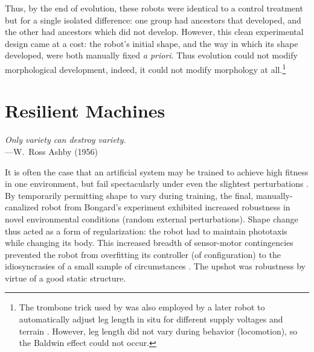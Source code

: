 Thus, by the end of evolution, these robots were identical to a control treatment but for a single isolated difference: one group had ancestors that developed, and the other had ancestors which did not develop.
However, this clean experimental design came at a cost: the robot's initial shape, and the way in which its shape developed, were both manually fixed \textit{a priori}. 
Thus evolution could not modify morphological development, indeed, it could not modify morphology at all.\footnote{%
The trombone trick used by \citet{bongard2011morphological} was also employed by a 
later robot to automatically adjust leg length in situ for different supply voltages \cite{nygaard2018real} and terrain
\cite{nygaard2020environmental}.
However, leg length did not vary during behavior (locomotion), so the Baldwin effect could not occur.
}



\section{Resilient Machines}


\begin{changemargin}{4em}{4em} 

\vspace{1em}

    \textit{Only variety can destroy variety.} \\[4pt]
    \hspace*{16.5em} ---W.~Ross Ashby (1956)
    
\vspace{1em}
    
    
\end{changemargin}


\noindent
It is often the case that an artificial system may be trained to achieve high fitness in one environment, but fail spectacularly under even the slightest perturbations \cite{athalye2018synthesizing,carlson2005ugvs}.
By temporarily permitting shape to vary during training, the final, manually-canalized robot from  Bongard's experiment \cite{bongard2011morphological}
exhibited increased robustness in novel environmental conditions (random external perturbations).
Shape change thus acted as a form of regularization: 
the robot had to maintain phototaxis while changing its body.
This increased breadth of sensor-motor contingencies prevented the robot from overfitting its controller (of configuration) to the idiosyncrasies of a small sample of circumstances \cite{jakobi1995noise}.
The upshot was robustness by virtue of a good static structure.

